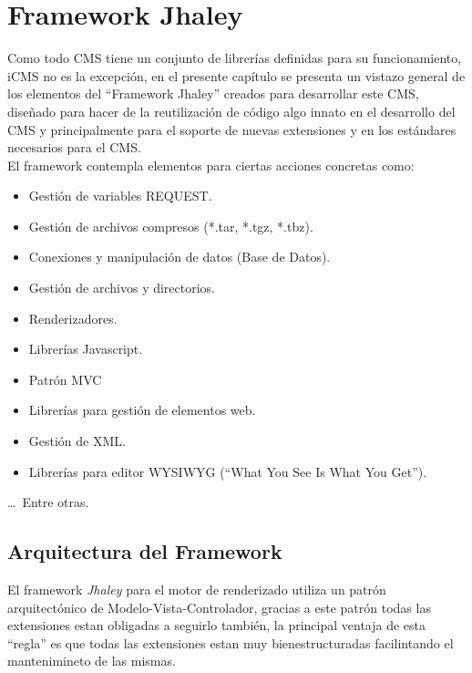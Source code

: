 \section{Framework Jhaley}
Como todo CMS tiene un conjunto de librer\'ias definidas para su funcionamiento, iCMS no es la excepci\'on, en el presente cap\'itulo se presenta un vistazo general de los elementos del ``Framework Jhaley'' creados para desarrollar este CMS, dise\~nado para hacer de la reutilizaci\'on de c\'odigo algo innato en el desarrollo del CMS y principalmente para el soporte de nuevas extensiones y en los est\'andares necesarios para el CMS.\\
El framework contempla elementos para ciertas acciones concretas como: 
\begin{itemize}
\item Gesti\'on de variables REQUEST.
\item Gesti\'on de archivos compresos (*.tar, *.tgz, *.tbz).
\item Conexiones y manipulaci\'on de datos (Base de Datos).
\item Gesti\'on de archivos y directorios.
\item Renderizadores.
\item Librer\'ias Javascript.
\item Patr\'on MVC
\item Librer\'ias para gesti\'on de elementos web.
\item Gesti\'on de XML.
\item Librer\'ias para editor WYSIWYG (``What You See Is What You Get'').
\end{itemize}
\ldots\ Entre otras.

\subsection{Arquitectura del Framework}
El framework \textit{Jhaley} para el motor de renderizado utiliza un patr\'on arquitect\'onico de Modelo-Vista-Controlador, gracias a este patr\'on todas las extensiones estan obligadas a seguirlo tambi\'en, la principal ventaja de esta ``regla'' es que todas las extensiones estan muy bienestructuradas facilintando el mantenimineto de las mismas.\\

